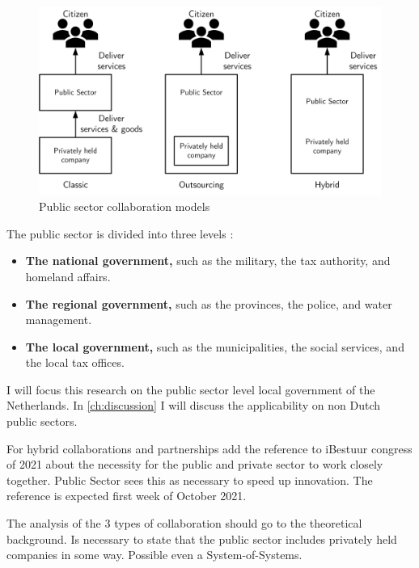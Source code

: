 \begin{figure}[H]
	\centering
	\includegraphics[width=0.7\linewidth]{images/publicsector3modelsofcolaboration}
	\caption[Public sector collaboration models]{Public sector collaboration models}
	\label{fig:publicsector3modelsofcolaboration}
\end{figure}

The public sector is divided into three levels \parencite{PrivacySense2016}:

\begin{itemize}
	\item{\textbf{The national government,} such as the military, the tax authority, and homeland affairs.}
	\item{\textbf{The regional government,} such as the provinces, the police, and water management.}
	\item{\textbf{The local government,} such as the municipalities, the social services, and the local tax offices.}
\end{itemize}

I will focus this research on the public sector level local government of the Netherlands. In \cref{ch:discussion} I will discuss the applicability on non Dutch public sectors.


\begin{remark}
	For hybrid collaborations and partnerships add the reference to iBestuur congress of 2021 about the necessity for the public and private sector to work closely together. Public Sector sees this as necessary to speed up innovation. The reference is expected first week of October 2021.
\end{remark}

\begin{remark}
	The analysis of the 3 types of collaboration should go to the theoretical background. Is necessary to state that the public sector includes privately held companies in some way. Possible even a System-of-Systems.
\end{remark}

